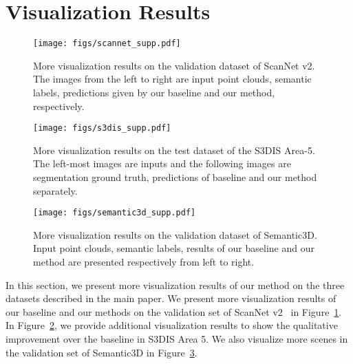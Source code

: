 \documentclass[final]{cvpr}
\begin{document}
\section{Visualization Results}
\label{sec:visual}


\begin{figure}[bht]
    \centering
    \texttt{[image: figs/scannet\_supp.pdf]}
    \caption{More visualization results on the validation dataset of ScanNet v2. The images from the left to right are input point clouds, semantic labels, predictions given by our baseline and our method, respectively.}
    \label{fig:scannet_supp}
\end{figure}

\begin{figure}[bht]
    \centering
    \texttt{[image: figs/s3dis\_supp.pdf]}
    \caption{More visualization results on the test dataset of the S3DIS Area-5. The left-most images are inputs and the following images are segmentation ground truth, predictions of baseline and our method separately.}
    \label{fig:s3dis_supp}
\end{figure}

\begin{figure}[bht]
    \centering
    \texttt{[image: figs/semantic3d\_supp.pdf]}
    \caption{More visualization results on the validation dataset of Semantic3D. Input point clouds, semantic labels, results of our baseline and our method are presented respectively from left to right.}
    \label{fig:semantic3d_supp}
\end{figure}


In this section, we present more visualization results of our method on the three datasets described in the main paper. We present more visualization results of our baseline and our methods on the validation set of ScanNet v2~\cite{dai2017scannet} in Figure~\ref{fig:scannet_supp}. In Figure~\ref{fig:s3dis_supp}, we provide additional visualization results to show the qualitative improvement over the baseline in S3DIS Area 5. We also visualize more scenes in the validation set of Semantic3D in Figure~\ref{fig:semantic3d_supp}.
\end{document}
